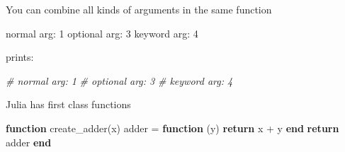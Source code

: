 \documentclass[ignorenonframetext,]{beamer}
\newenvironment{Shaded}{}{}
\newcommand{\KeywordTok}[1]{\textcolor[rgb]{0.00,0.44,0.13}{\textbf{{#1}}}}
\newcommand{\FloatTok}[1]{\textcolor[rgb]{0.25,0.63,0.44}{{#1}}}
\newcommand{\StringTok}[1]{\textcolor[rgb]{0.25,0.44,0.63}{{#1}}}
\newcommand{\CommentTok}[1]{\textcolor[rgb]{0.38,0.63,0.69}{\textit{{#1}}}}
\newcommand{\NormalTok}[1]{{#1}}
\begin{document}
\begin{frame}[fragile]{You can combine all kinds of arguments in the
same function}

\begin{Shaded}
\end{Shaded}

\begin{Shaded}
\begin{Highlighting}[]
\NormalTok{normal arg: }\FloatTok{1}
\NormalTok{optional arg: }\FloatTok{3}
\NormalTok{keyword arg: }\FloatTok{4}
\end{Highlighting}
\end{Shaded}

prints:

\begin{Shaded}
\begin{Highlighting}[]
\CommentTok{#   normal arg: 1}
\CommentTok{#   optional arg: 3}
\CommentTok{#   keyword arg: 4}
\end{Highlighting}
\end{Shaded}

\end{frame}

\begin{frame}[fragile]{Julia has first class functions}

\begin{Shaded}
\begin{Highlighting}[]
\KeywordTok{function} \NormalTok{create_adder(x)}
    \NormalTok{adder = }\KeywordTok{function} \NormalTok{(y)}
        \KeywordTok{return} \NormalTok{x + y}
    \KeywordTok{end}
    \KeywordTok{return} \NormalTok{adder}
\KeywordTok{end}
\end{Highlighting}
\end{Shaded}

\end{frame}
\end{document}
